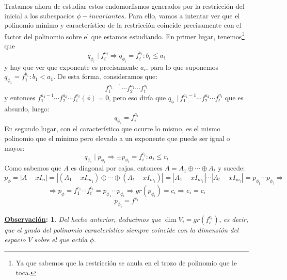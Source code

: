 \documentclass[10pt,a4paper,openright]{book}
\theoremstyle{break}
\newtheorem*{obs}{\underline{Observación}:}
\begin{document}
Tratamos ahora de estudiar estos endomorfismos generados por la restricción del inicial a los subespacios $\phi-invariantes$. Para ello, vamos a intentar ver que el polinomio mínimo y característico de la restricción coincide precisamente con el factor del polinomio sobre el que estamos estudiando. En primer lugar, tenemos\footnote{Ya que sabemos que la restricción se anula en el trozo de polinomio que le toca.} que 
$$q_{\phi_i}\mid f_i^{a_i}\Rightarrow q_{\phi_i}=f_{i}^{b_i}: b_i\leq a_i$$
y hay que ver que exponente es precisamente $a_i$, para lo que suponemos $q_{\phi_1}=f_1^{b_1}: b_1<a_1$. De esta forma, consideramos que:
$$f_1^{a_1-1}\cdots f_2^{a_2} \cdots f_t^{a_t}$$
y entonces $f_1^{a_1-1}\cdots f_2^{a_2} \cdots f_t^{a_t}(\phi)=0$, pero eso diría que $q_\phi\mid f_1^{a_1-1}\cdots f_2^{a_2} \cdots f_t^{a_t}$ que es absurdo, luego:
$$\boxed{q_{\phi_i}=f_i^{a_i}}$$
En segundo lugar, con el característico que ocurre lo mismo, es el mismo polinomio que el mínimo pero elevado a un exponente que puede ser igual o mayor:
$$q_{\phi_i} \mid p_{\phi_i} \Rightarrow \pm p_{\phi_i} = f_i^{c_i}: a_i\leq c_i$$
Como sabemos que $A$ es diagonal por cajas, entonces $A=A_1\oplus \cdots \oplus A_t$ y sucede:
$$p_\phi=|A-xI_n|=|(A_1-xI_{m_1})\oplus \cdots \oplus (A_t-xI_{m_t})|=|A_1-xI_{m_1}|\cdots |A_t-xI_{m_t}|=p_{\phi_1}\cdots p_{\phi_t}\Rightarrow $$
$$\Rightarrow p_\phi= f_1^{c_1}\cdots f_t^{c_t}=p_{\phi_1}\cdots p_{\phi_t}\Rightarrow gr(p_{\phi_i})=c_i\Rightarrow e_i=c_i$$
$$\boxed{p_{\phi_i} = f^{e_i}}$$

\begin{obs}
Del hecho anterior, deducimos que $\dim V_i=gr(f_i^{e_i})$, es decir, que el grado del polinomio característico siempre coincide con la dimensión del espacio $V$ sobre el que actúa $\phi$.
\end{obs}
\end{document}
